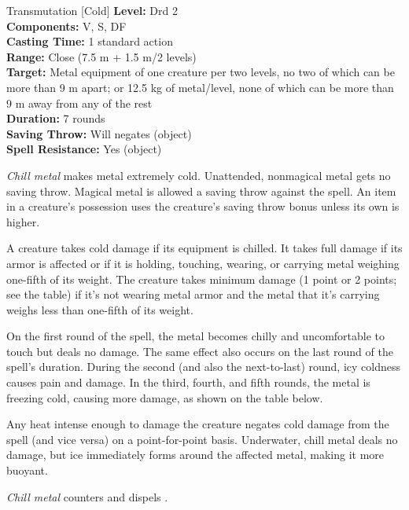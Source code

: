 {Transmutation [Cold]}
{
	\textbf{Level:}
	Drd 2\\
	\textbf{Components:}
	V, S, DF\\
	\textbf{Casting Time:}
	1 standard action\\
	\textbf{Range:}
	Close (7.5 m + 1.5 m/2 levels)\\
	\textbf{Target:}
	Metal equipment of one creature per two levels, no two of which can be more than 9 m apart; or 12.5 kg of metal/level, none of which can be more than 9 m away from any of the rest\\
	\textbf{Duration:}
	7 rounds\\
	\textbf{Saving Throw:}
	Will negates (object)\\
	\textbf{Spell Resistance:}
	Yes (object)\\
}
{
	\emph{Chill metal} makes metal extremely cold. Unattended, nonmagical metal gets no saving throw. Magical metal is allowed a saving throw against the spell. An item in a creature's possession uses the creature's saving throw bonus unless its own is higher.

	A creature takes cold damage if its equipment is chilled. It takes full damage if its armor is affected or if it is holding, touching, wearing, or carrying metal weighing one-fifth of its weight. The creature takes minimum damage (1 point or 2 points; see the table) if it's not wearing metal armor and the metal that it's carrying weighs less than one-fifth of its weight.


	On the first round of the spell, the metal becomes chilly and uncomfortable to touch but deals no damage. The same effect also occurs on the last round of the spell's duration. During the second (and also the next-to-last) round, icy coldness causes pain and damage. In the third, fourth, and fifth rounds, the metal is freezing cold, causing more damage, as shown on the table below.

	Any heat intense enough to damage the creature negates cold damage from the spell (and vice versa) on a point-for-point basis. Underwater, chill metal deals no damage, but ice immediately forms around the affected metal, making it more buoyant.

	\emph{Chill metal} counters and dispels .

}
